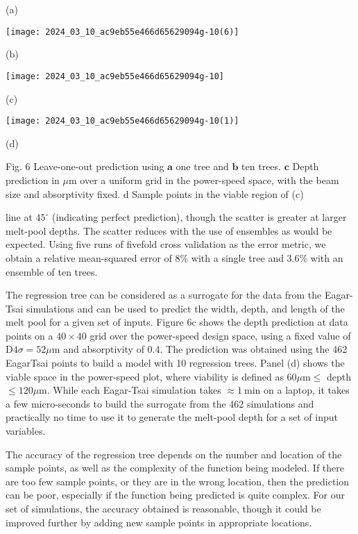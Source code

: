 \documentclass[10pt]{article}
\begin{document}
(a)

\begin{center}
\texttt{[image: 2024\_03\_10\_ac9eb55e466d65629094g-10(6)]}
\end{center}

(b)

\begin{center}
\texttt{[image: 2024\_03\_10\_ac9eb55e466d65629094g-10]}
\end{center}

(c)

\begin{center}
\texttt{[image: 2024\_03\_10\_ac9eb55e466d65629094g-10(1)]}
\end{center}

(d)

Fig. 6 Leave-one-out prediction using $\mathbf{a}$ one tree and $\mathbf{b}$ ten trees. $\mathbf{c}$ Depth prediction in $\mu \mathrm{m}$ over a uniform grid in the power-speed space, with the beam size and absorptivity fixed. d Sample points in the viable region of (c)

line at $45^{\circ}$ (indicating perfect prediction), though the scatter is greater at larger melt-pool depths. The scatter reduces with the use of ensembles as would be expected. Using five runs of fivefold cross validation as the error metric, we obtain a relative mean-squared error of $8 \%$ with a single tree and $3.6 \%$ with an ensemble of ten trees.

The regression tree can be considered as a surrogate for the data from the Eagar-Tsai simulations and can be used to predict the width, depth, and length of the melt pool for a given set of inputs. Figure $6 \mathrm{c}$ shows the depth prediction at data points on a $40 \times 40$ grid over the power-speed design space, using a fixed value of $\mathrm{D} 4 \sigma=52 \mu \mathrm{m}$ and absorptivity of 0.4. The prediction was obtained using the 462 EagarTsai points to build a model with 10 regression trees. Panel (d) shows the viable space in the power-speed plot, where viability is defined as $60 \mu \mathrm{m} \leq$ depth $\leq 120 \mu \mathrm{m}$. While each Eagar-Tsai simulation takes $\approx 1 \mathrm{~min}$ on a laptop, it takes a few micro-seconds to build the surrogate from the 462 simulations and practically no time to use it to generate the melt-pool depth for a set of input variables.

The accuracy of the regression tree depends on the number and location of the sample points, as well as the complexity of the function being modeled. If there are too few sample points, or they are in the wrong location, then the prediction can be poor, especially if the function being predicted is quite complex. For our set of simulations, the accuracy obtained is reasonable, though it could be improved further by adding new sample points in appropriate locations.
\end{document}
